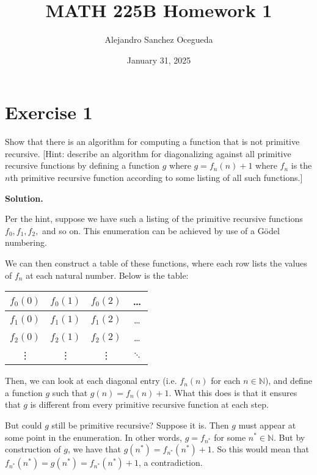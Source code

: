 \documentclass{article}
\title{MATH 225B Homework 1}
\author{Alejandro Sanchez Ocegueda}
\date{January 31, 2025}
\newcommand{\nat}{\mathbb{N}}
\newcommand{\solution}{\noindent \textbf{Solution.}}
\begin{document}
\maketitle

\section*{Exercise 1}
Show that there is an algorithm for computing a function that is not primitive recursive.
[Hint: describe an algorithm for diagonalizing against all primitive recursive functions by defining a function $g$ where $g = f_n(n) + 1$ where $f_n$ is the $n$th primitive recursive function according to some listing of all such functions.]

\vspace{3mm}
\solution

Per the hint, suppose we have such a listing of the primitive recursive functions $f_0, f_1, f_2,$ and so on.
This enumeration can be achieved by use of a Gödel numbering.


We can then construct a table of these functions, where each row lists the values of $f_n$ at each natural number.
Below is the table:
\begin{table}[h!]
  \begin{center}
    \label{tab:table1}
    \begin{tabular}{|c|c|c|c} %
    \hline
      $f_0(0)$ & $f_0(1)$ & $f_0(2)$ & \dots \\
      \hline
      $f_1(0)$ & $f_1(1)$ & $f_1(2)$ & \dots\\
      \hline
      $f_2(0)$ & $f_2(1)$ & $f_2(2)$ & \dots \\
      \hline
      \vdots & \vdots & \vdots & $\ddots$
    \end{tabular}
  \end{center}
\end{table}
Then, we can look at each diagonal entry (i.e. $f_n(n)$ for each $n \in \nat$), and define a function $g$ such that $g(n) = f_n(n) + 1$.
What this does is that it ensures that $g$ is different from every primitive recursive function at each step.

But could $g$ still be primitive recursive?
Suppose it is.
Then $g$ must appear at some point in the enumeration.
In other words, $g = f_{n^*}$ for some $n^* \in \nat$.
But by construction of $g$, we have that $g(n^*) = f_{n^*}(n^*) + 1$.
So this would mean that $f_{n^*}(n^*) = g(n^*) = f_{n^*}(n^*)+1$, a contradiction.
\end{document}
